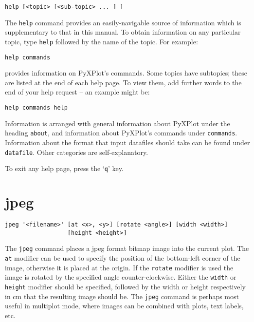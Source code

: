 \documentclass[a4paper,onecolumn,11pt]{book}
\begin{document}
\begin{verbatim}
help [<topic> [<sub-topic> ... ] ]
\end{verbatim}

The {\tt help} command provides an easily-navigable source of information which
is supplementary to that in this manual.  To obtain information on any
particular topic, type {\tt help} followed by the name of the topic. For
example:

\begin{verbatim}
help commands
\end{verbatim}

\noindent provides information on PyXPlot's commands. Some topics have subtopics; these
are listed at the end of each help page. To view them, add further words to the
end of your help request -- an example might be:

\begin{verbatim}
help commands help
\end{verbatim}

Information is arranged with general information about PyXPlot under the heading
{\tt about}, and information about PyXPlot's commands under {\tt commands}.
Information about the format that input datafiles should take can be found
under {\tt datafile}.  Other categories are self-explanatory.

To exit any help page, press the `{\tt q}' key.

\section{jpeg}

\begin{verbatim}
jpeg '<filename>' [at <x>, <y>] [rotate <angle>] [width <width>]
                  [height <height>]
\end{verbatim}

The {\tt jpeg} command places a jpeg format bitmap image into the current plot.
The {\tt at} modifier can be used to specify the position of the bottom-left
corner of the image, otherwise it is placed at the origin.  If the {\tt rotate}
modifier is used the image is rotated by the specified angle counter-clockwise.
Either the {\tt width} or {\tt height} modifier should be specified, followed by
the width or height respectively in cm that the resulting image should be.  The
{\tt jpeg} command is perhaps most useful in multiplot mode, where images can be
combined with plots, text labels, etc.
\end{document}
